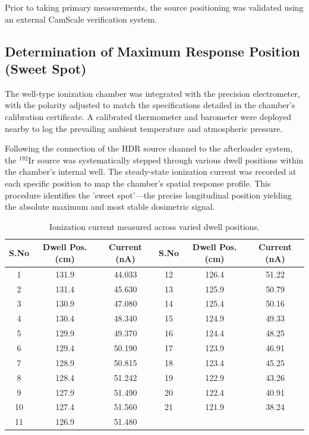 Prior to taking primary measurements, the source positioning was validated using an external CamScale verification system.

\subsection{Determination of Maximum Response Position (Sweet Spot)}
The well-type ionization chamber was integrated with the precision electrometer, with the polarity adjusted to match the specifications detailed in the chamber's calibration certificate. A calibrated thermometer and barometer were deployed nearby to log the prevailing ambient temperature and atmospheric pressure. 

Following the connection of the HDR source channel to the afterloader system, the $^{192}$Ir source was systematically stepped through various dwell positions within the chamber's internal well. The steady-state ionization current was recorded at each specific position to map the chamber's spatial response profile. This procedure identifies the 'sweet spot'—the precise longitudinal position yielding the absolute maximum and most stable dosimetric signal.

\begin{table}[H]
    \centering
    \caption{Ionization current measured across varied dwell positions.}
    \begin{tabular}{|c|c|c||c|c|c|}
        \hline
        \textbf{S.No} & \textbf{Dwell Pos. (cm)} & \textbf{Current (nA)} & \textbf{S.No} & \textbf{Dwell Pos. (cm)} & \textbf{Current (nA)}\\
        \hline
        1 & 131.9 & 44.033 & 12 & 126.4 & 51.22 \\
        2 & 131.4 & 45.630 & 13 & 125.9 & 50.79 \\
        3 & 130.9 & 47.080 & 14 & 125.4 & 50.16 \\
        4 & 130.4 & 48.340 & 15 & 124.9 & 49.33 \\
        5 & 129.9 & 49.370 & 16 & 124.4 & 48.25 \\
        6 & 129.4 & 50.190 & 17 & 123.9 & 46.91 \\
        7 & 128.9 & 50.815 & 18 & 123.4 & 45.25 \\
        8 & 128.4 & 51.242 & 19 & 122.9 & 43.26 \\
        9 & 127.9 & 51.490 & 20 & 122.4 & 40.91 \\
        10 & 127.4 & 51.560 & 21 & 121.9 & 38.24 \\
        11 & 126.9 & 51.480 & & & \\
        \hline
    \end{tabular}
\end{table}

